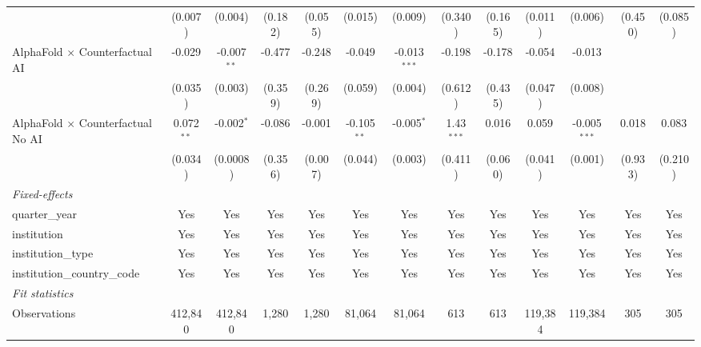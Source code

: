 \begin{tabular}{lcccccccccccc}
                                            & (0.007)       & (0.004)       & (0.182)       & (0.055) & (0.015)       & (0.009)        & (0.340)       & (0.165) & (0.011)       & (0.006)        & (0.450) & (0.085)\\   
   AlphaFold $\times$ Counterfactual AI     & -0.029        & -0.007$^{**}$ & -0.477        & -0.248  & -0.049        & -0.013$^{***}$ & -0.198        & -0.178  & -0.054        & -0.013         &         &   \\   
                                            & (0.035)       & (0.003)       & (0.359)       & (0.269) & (0.059)       & (0.004)        & (0.612)       & (0.435) & (0.047)       & (0.008)        &         &   \\   
   AlphaFold $\times$ Counterfactual No AI  & 0.072$^{**}$  & -0.002$^{*}$  & -0.086        & -0.001  & -0.105$^{**}$ & -0.005$^{*}$   & 1.43$^{***}$  & 0.016   & 0.059         & -0.005$^{***}$ & 0.018   & 0.083\\   
                                            & (0.034)       & (0.0008)      & (0.356)       & (0.007) & (0.044)       & (0.003)        & (0.411)       & (0.060) & (0.041)       & (0.001)        & (0.933) & (0.210)\\   
   \midrule
   \emph{Fixed-effects}\\
   quarter\_year                            & Yes           & Yes           & Yes           & Yes     & Yes           & Yes            & Yes           & Yes     & Yes           & Yes            & Yes     & Yes\\  
   institution                              & Yes           & Yes           & Yes           & Yes     & Yes           & Yes            & Yes           & Yes     & Yes           & Yes            & Yes     & Yes\\  
   institution\_type                        & Yes           & Yes           & Yes           & Yes     & Yes           & Yes            & Yes           & Yes     & Yes           & Yes            & Yes     & Yes\\  
   institution\_country\_code               & Yes           & Yes           & Yes           & Yes     & Yes           & Yes            & Yes           & Yes     & Yes           & Yes            & Yes     & Yes\\  
   \midrule
   \emph{Fit statistics}\\
   Observations                             & 412,840       & 412,840       & 1,280         & 1,280   & 81,064        & 81,064         & 613           & 613     & 119,384       & 119,384        & 305     & 305\\  

\end{tabular}

